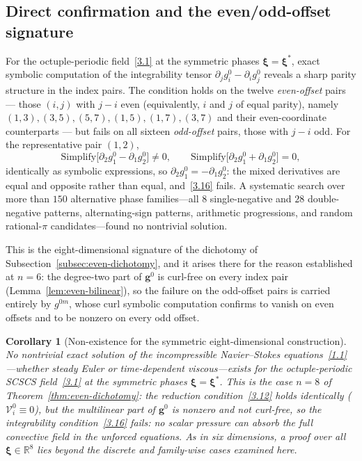 \documentclass[11pt]{jfm}
\newtheorem{corollary}[lemma]{Corollary}
\numberwithin{equation}{section}
\begin{document}
\subsection{Direct confirmation and the even/odd-offset signature}
For the octuple-periodic field~\eqref{3.1} at the symmetric phases
$\boldsymbol{\xi}=\boldsymbol{\xi}^{\ast}$, exact symbolic
computation of the integrability tensor $\partial_j g_i^0-\partial_i g_j^0$ reveals a sharp
parity structure in the index pairs. The condition holds on the twelve \emph{even-offset} pairs
--- those $(i,j)$ with $j-i$ even (equivalently, $i$ and $j$ of equal parity), namely
$(1,3),(3,5),(5,7),(1,5),(1,7),(3,7)$ and their even-coordinate counterparts --- but fails on all
sixteen \emph{odd-offset} pairs, those with $j-i$ odd. For the representative pair $(1,2)$,
\begin{equation}
\label{8.11}
\mathrm{Simplify}\bigl[\partial_2 g_1^0 - \partial_1 g_2^0\bigr] \neq 0, \qquad
\mathrm{Simplify}\bigl[\partial_2 g_1^0 + \partial_1 g_2^0\bigr] = 0,
\end{equation}
identically as symbolic expressions, so $\partial_2 g_1^0 = -\partial_1 g_2^0$: the mixed
derivatives are equal and opposite rather than equal, and~\eqref{3.16} fails. A systematic
search over more than $150$ alternative phase families---all $8$ single-negative and $28$
double-negative patterns, alternating-sign patterns, arithmetic progressions, and
random rational-$\pi$ candidates---found no nontrivial solution.

This is the eight-dimensional signature of the dichotomy of
Subsection~\ref{subsec:even-dichotomy}, and it arises there for the reason established at $n=6$:
the degree-two part of $\boldsymbol{g}^0$ is curl-free on every index pair
(Lemma~\ref{lem:even-bilinear}), so the failure on the odd-offset pairs is carried entirely by
$g^{0m}$, whose curl symbolic computation confirms to vanish on even offsets and to be nonzero on
every odd offset.

\begin{corollary}[Non-existence for the symmetric eight-dimensional construction]
\label{lem:8D}
No nontrivial exact solution of the incompressible Navier--Stokes
equations~\eqref{1.1}---whether steady Euler or time-dependent viscous---exists for the
octuple-periodic SCSCS field~\eqref{3.1} at the symmetric phases
$\boldsymbol{\xi}=\boldsymbol{\xi}^{\ast}$. This is the case $n=8$ of
Theorem~\ref{thm:even-dichotomy}: the reduction condition~\eqref{3.12} holds identically
($\mathcal{V}_i^0\equiv0$), but the multilinear part of $\boldsymbol{g}^0$ is nonzero and not
curl-free, so the integrability condition~\eqref{3.16} fails: no scalar pressure can absorb the full
convective field in the unforced equations. As in six dimensions, a
proof over all $\boldsymbol{\xi}\in\mathbb{R}^8$ lies beyond the discrete and family-wise cases
examined here.
\end{corollary}
\end{document}
